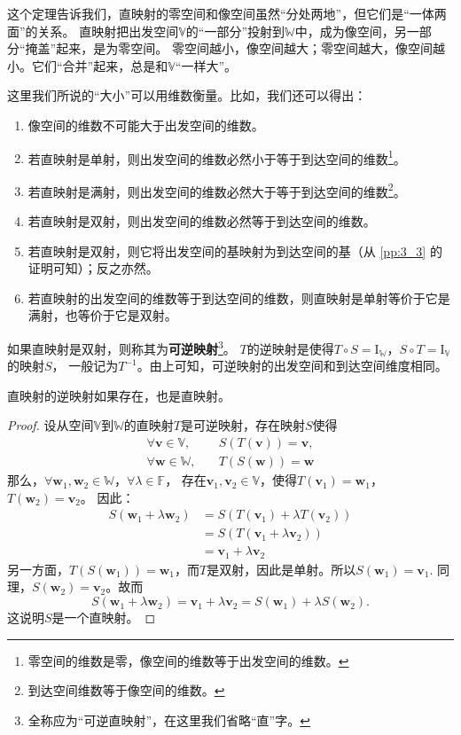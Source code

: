 \documentclass[12pt,UTF8]{ctexbook}
\begin{document}
这个定理告诉我们，直映射的零空间和像空间虽然“分处两地”，但它们是“一体两面”的关系。
直映射把出发空间$\mathbb{V}$的“一部分”投射到$\mathbb{W}$中，成为像空间，另一部分“掩盖”起来，是为零空间。
零空间越小，像空间越大；零空间越大，像空间越小。它们“合并”起来，总是和$\mathbb{V}$“一样大”。

这里我们所说的“大小”可以用维数衡量。比如，我们还可以得出：
\begin{enumerate}
    \item 像空间的维数不可能大于出发空间的维数。
    \item 若直映射是单射，则出发空间的维数必然小于等于到达空间的维数\footnote{零空间的维数是零，像空间的维数等于出发空间的维数。}。
    \item 若直映射是满射，则出发空间的维数必然大于等于到达空间的维数\footnote{到达空间维数等于像空间的维数。}。
    \item 若直映射是双射，则出发空间的维数必然等于到达空间的维数。
    \item 若直映射是双射，则它将出发空间的基映射为到达空间的基（从 \ref{pp:3_3} 的证明可知）；反之亦然。
    \item 若直映射的出发空间的维数等于到达空间的维数，则直映射是单射等价于它是满射，也等价于它是双射。
\end{enumerate}
如果直映射是双射，则称其为\textbf{可逆映射}\footnote{全称应为“可逆直映射”，在这里我们省略“直”字。}。
$T$的逆映射是使得$T\circ S = \mathrm{I}_{\mathbb{W}}$，$S\circ T = \mathrm{I}_{\mathbb{V}}$的映射$S$，
一般记为$T^{-1}$。由上可知，可逆映射的出发空间和到达空间维度相同。

\begin{pp}\label{pp:3_3_2}
    直映射的逆映射如果存在，也是直映射。
\end{pp}
\begin{proof} %
    设从空间$\mathbb{V}$到$\mathbb{W}$的直映射$T$是可逆映射，存在映射$S$使得
    \begin{align*}
        \forall \mathbf{v} \in \mathbb{V} ,& \quad S(T(\mathbf{v})) = \mathbf{v},   \\
        \forall \mathbf{w} \in \mathbb{W} ,& \quad T(S(\mathbf{w})) = \mathbf{w} 
    \end{align*}
    那么，$\forall \mathbf{w}_1, \mathbf{w}_2 \in \mathbb{W}$，$\forall \lambda \in \mathbb{F}$，
    存在$\mathbf{v}_1, \mathbf{v}_2 \in \mathbb{V}$，使得$T(\mathbf{v}_1) = \mathbf{w}_1$，$T(\mathbf{w}_2) = \mathbf{v}_2$。
    因此：
    \begin{align*}
        S(\mathbf{w}_1 + \lambda\mathbf{w}_2) &= S(T(\mathbf{v}_1) + \lambda T(\mathbf{v}_2))  \\
        &= S(T(\mathbf{v}_1 + \lambda \mathbf{v}_2))  \\
        &= \mathbf{v}_1 + \lambda \mathbf{v}_2  
    \end{align*}
    另一方面，$T(S(\mathbf{w}_1)) = \mathbf{w}_1$，而$T$是双射，因此是单射。所以$S(\mathbf{w}_1) = \mathbf{v}_1$. 
    同理，$S(\mathbf{w}_2) = \mathbf{v}_2$。故而
    $$ S(\mathbf{w}_1 + \lambda\mathbf{w}_2) = \mathbf{v}_1 + \lambda \mathbf{v}_2 = S(\mathbf{w}_1) + \lambda S(\mathbf{w}_2).$$
    这说明$S$是一个直映射。
\end{proof}
\end{document}
